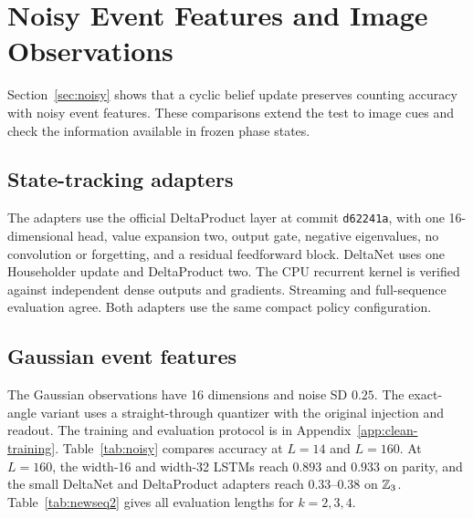 \section{Noisy Event Features and Image Observations}
\label{app:noisy}
Section~\ref{sec:noisy} shows that a cyclic belief update preserves counting
accuracy with noisy event features. These comparisons extend the test to
image cues and check the information available in frozen phase states.

\subsection{State-tracking adapters}
\label{app:adapters}
The adapters use the official DeltaProduct layer at commit
\texttt{d62241a}, with one 16-dimensional head, value expansion two, output gate,
negative eigenvalues, no convolution or forgetting, and a residual feedforward
block. DeltaNet uses one Householder update and DeltaProduct two. The CPU
recurrent kernel is verified against independent dense outputs and gradients.
Streaming and full-sequence evaluation agree. Both adapters use the same
compact policy configuration.

\subsection{Gaussian event features}
\label{app:gaussian}
The Gaussian observations have 16 dimensions and noise SD $0.25$.
The exact-angle variant uses a straight-through quantizer with the original
injection and readout. The training and evaluation protocol is in
Appendix~\ref{app:clean-training}.
Table~\ref{tab:noisy} compares accuracy at $L=14$ and $L=160$.
At $L=160$, the width-16 and width-32 LSTMs reach $0.893$
and $0.933$ on parity, and the small DeltaNet and DeltaProduct adapters reach
$0.33$--$0.38$ on $\mathbb{Z}_3$. Table~\ref{tab:newseq2} gives all evaluation lengths
for $k=2,3,4$.

